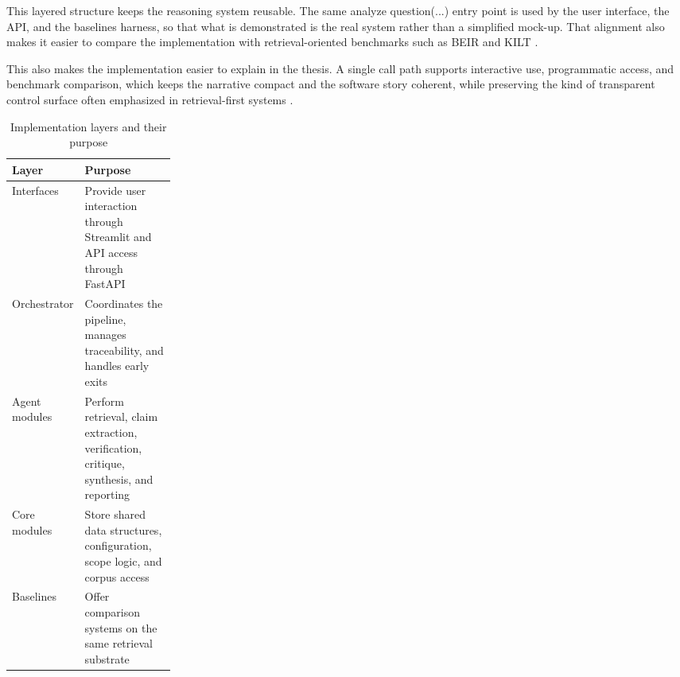 This layered structure keeps the reasoning system reusable. The same analyze question(...) entry point is used by the user
interface, the API, and the baselines harness, so that what is
demonstrated is the real system rather than a simplified mock-up. That
alignment also makes it easier to compare the implementation with
retrieval-oriented benchmarks such as BEIR and KILT \cite{thakur2021beir,petroni2020kilt,ragsurvey2024}.

This also makes the implementation easier to explain in the thesis. A
single call path supports interactive use, programmatic access, and
benchmark comparison, which keeps the narrative compact and the software
story coherent, while preserving the kind of transparent control surface
often emphasized in retrieval-first systems \cite{karpukhin2020dpr,khattab2020colbert,lewis2020rag}.

\begin{table}[H]
\centering
\small
\setlength{\tabcolsep}{5pt}
\renewcommand{\arraystretch}{1.15}
\caption{Implementation layers and their purpose}
\begin{tabularx}{0.98\linewidth}{>{\raggedright\arraybackslash}p{0.24\linewidth} >{\raggedright\arraybackslash}X}
\toprule
Layer & Purpose \\
\midrule
Interfaces & Provide user interaction through Streamlit and API access through FastAPI \\
Orchestrator & Coordinates the pipeline, manages traceability, and handles early exits \\
Agent modules & Perform retrieval, claim extraction, verification, critique, synthesis, and reporting \\
Core modules & Store shared data structures, configuration, scope logic, and corpus access \\
Baselines & Offer comparison systems on the same retrieval substrate \\
\bottomrule
\end{tabularx}
\end{table}

